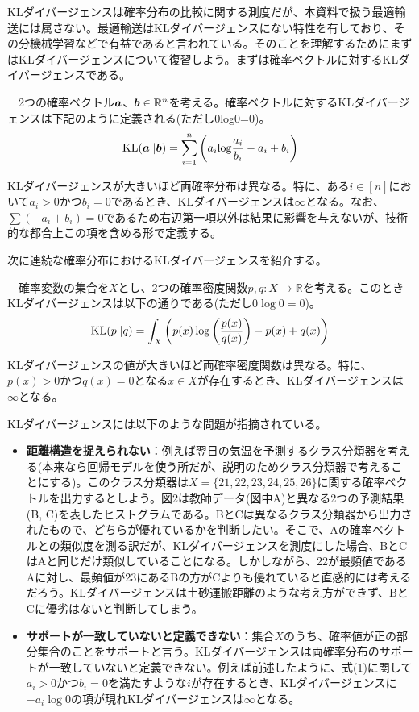 \documentclass[dvipdfmx, 9pt, a4paper]{jsarticle}
\newcommand{\bm}[1]{{\mbox{\boldmath $#1$}}}
\begin{document}
KLダイバージェンスは確率分布の比較に関する測度だが、本資料で扱う最適輸送には属さない。最適輸送はKLダイバージェンスにない特性を有しており、その分機械学習などで有益であると言われている。そのことを理解するためにまずはKLダイバージェンスについて復習しよう。まずは確率ベクトルに対するKLダイバージェンスである。
\begin{tcolorbox}[title=確率ベクトルに対するKLダイバージェンス]
　2つの確率ベクトル$\bm a$、$\bm b \in \mathbb{R}^n$を考える。確率ベクトルに対するKLダイバージェンスは下記のように定義される(ただし0log0=0)。
\begin{equation}
{\rm KL}(\bm a||\bm b)=\sum_{i=1}^n\left(a_i{\rm log}\frac{a_i}{b_i}-a_i+b_i\right)
\end{equation}
\end{tcolorbox}
KLダイバージェンスが大きいほど両確率分布は異なる。特に、ある$i \in [n]$において$a_i>0$かつ$b_i=0$であるとき、KLダイバージェンスは$\infty$となる。なお、$\sum(-a_i+b_i)=0$であるため右辺第一項以外は結果に影響を与えないが、技術的な都合上この項を含める形で定義する。\par
次に連続な確率分布におけるKLダイバージェンスを紹介する。
\begin{tcolorbox}[title=確率密度関数に対するKLダイバージェンス]
　確率変数の集合を$X$とし、2つの確率密度関数$p, q:X \to \mathbb{R}$を考える。このときKLダイバージェンスは以下の通りである(ただし$0\log0=0$)。
\begin{equation}
{\rm KL}(p||q)=\int_X\left( p(x)\log\left(\frac{p(x)}{q(x)}\right)-p(x)+q(x) \right)
\end{equation}
\end{tcolorbox}
KLダイバージェンスの値が大きいほど両確率密度関数は異なる。特に、$p(x)>0$かつ$q(x)=0$となる$x \in X$が存在するとき、KLダイバージェンスは$\infty$となる。\par
KLダイバージェンスには以下のような問題が指摘されている。
\begin{itemize}
\item {\bf 距離構造を捉えられない}：例えば翌日の気温を予測するクラス分類器を考える(本来なら回帰モデルを使う所だが、説明のためクラス分類器で考えることにする)。このクラス分類器は$X=\{21, 22, 23, 24, 25, 26\}$に関する確率ベクトルを出力するとしよう。図2は教師データ(図中A)と異なる2つの予測結果(B, C)を表したヒストグラムである。BとCは異なるクラス分類器から出力されたもので、どちらが優れているかを判断したい。そこで、Aの確率ベクトルとの類似度を測る訳だが、KLダイバージェンスを測度にした場合、BとCはAと同じだけ類似していることになる。しかしながら、22が最頻値であるAに対し、最頻値が23にあるBの方がCよりも優れていると直感的には考えるだろう。KLダイバージェンスは土砂運搬距離のような考え方ができず、BとCに優劣はないと判断してしまう。
\item {\bf サポートが一致していないと定義できない}：集合$X$のうち、確率値が正の部分集合のことをサポートと言う。KLダイバージェンスは両確率分布のサポートが一致していないと定義できない。例えば前述したように、式(1)に関して$a_i>0$かつ$b_i=0$を満たすような$i$が存在するとき、KLダイバージェンスに$-a_i\log0$の項が現れKLダイバージェンスは$\infty$となる。
\end{itemize}
\end{document}
